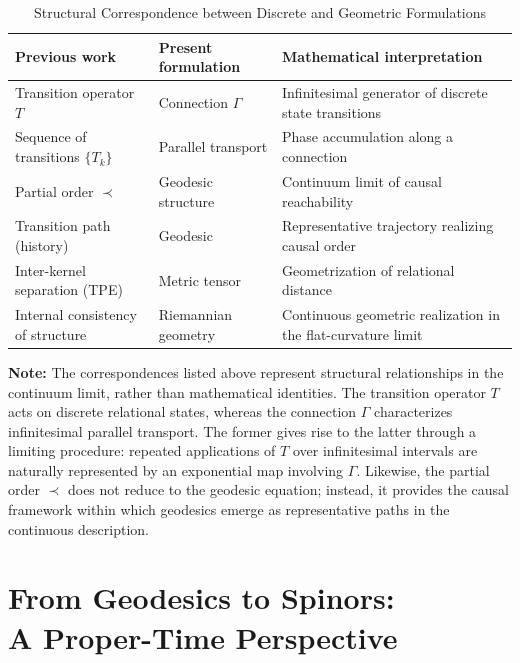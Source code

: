 \documentclass[%
 reprint,
 amsmath,amssymb,
 aps,
 prb,
]{revtex4-2}
\numberwithin{equation}{section}
\begin{document}
\begin{table}[t!]
\centering
\caption{Structural Correspondence between Discrete and Geometric Formulations}
\label{tab:correspondence_previous_current}
\renewcommand{\arraystretch}{1.4}
\begin{tabular}{p{5.0cm}p{5.5cm}p{5.5cm}}
\toprule
\textbf{Previous work} & \textbf{Present formulation\cite{hanamura17765336}} & \textbf{Mathematical interpretation} \\
\midrule
Transition operator $T$ & Connection $\Gamma$ & Infinitesimal generator of discrete state transitions \\
\addlinespace[0.3cm]
Sequence of transitions $\{T_k\}$ & Parallel transport & Phase accumulation along a connection \\
\addlinespace[0.3cm]
Partial order $\prec$ & Geodesic structure & Continuum limit of causal reachability \\
\addlinespace[0.3cm]
Transition path (history) & Geodesic & Representative trajectory realizing causal order \\
\addlinespace[0.3cm]
Inter-kernel separation (TPE) & Metric tensor & Geometrization of relational distance \\
\addlinespace[0.3cm]
Internal consistency of structure & Riemannian geometry & Continuous geometric realization in the flat-curvature limit \\
\bottomrule
\end{tabular}
\vspace{0.2cm}
\begin{flushleft}
\footnotesize
\textbf{Note:} The correspondences listed above represent structural relationships in the continuum limit, rather than mathematical identities. 
The transition operator $T$ acts on discrete relational states, whereas the connection $\Gamma$ characterizes infinitesimal parallel transport. 
The former gives rise to the latter through a limiting procedure: repeated applications of $T$ over infinitesimal intervals are naturally represented by an exponential map involving $\Gamma$. 
Likewise, the partial order $\prec$ does not reduce to the geodesic equation; instead, it provides the causal framework within which geodesics emerge as representative paths in the continuous description.
\end{flushleft}
\end{table}

\section{From Geodesics to Spinors:\\ A Proper-Time Perspective}
\label{sec:geodesics_spinors}
\end{document}
